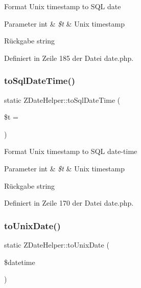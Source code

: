 Format Unix timestamp to S\+QL date


\begin{DoxyParams}[1]{Parameter}
int & {\em \$t} & Unix timestamp\\
\hline
\end{DoxyParams}
\begin{DoxyReturn}{Rückgabe}
string 
\end{DoxyReturn}


Definiert in Zeile 185 der Datei date.\+php.

\mbox{\label{class_z_date_helper_a40b4ee29889ec7c6444648bd4e7bbd99}} 
\subsubsection{\texorpdfstring{to\+Sql\+Date\+Time()}{toSqlDateTime()}}
{\footnotesize\ttfamily static Z\+Date\+Helper\+::to\+Sql\+Date\+Time (\begin{DoxyParamCaption}\item[{}]{\$t = {} }\end{DoxyParamCaption})\hspace{0.3cm}{\ttfamily [static]}}

Format Unix timestamp to S\+QL date-\/time


\begin{DoxyParams}[1]{Parameter}
int & {\em \$t} & Unix timestamp\\
\hline
\end{DoxyParams}
\begin{DoxyReturn}{Rückgabe}
string 
\end{DoxyReturn}


Definiert in Zeile 170 der Datei date.\+php.

\mbox{\label{class_z_date_helper_ac366b0b42b39f55be33ef5b528cfac6a}} 
\subsubsection{\texorpdfstring{to\+Unix\+Date()}{toUnixDate()}}
{\footnotesize\ttfamily static Z\+Date\+Helper\+::to\+Unix\+Date (\begin{DoxyParamCaption}\item[{}]{\$datetime }\end{DoxyParamCaption})\hspace{0.3cm}{\ttfamily [static]}}

